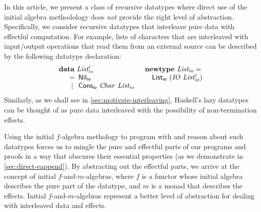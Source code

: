 \documentclass{jfp1}
\newcommand{\kw}[1]{\textbf{#1}}
\begin{document}
In this article, we present a class of recursive datatypes where
direct use of the initial algebra methodology does \emph{not} provide
the right level of abstraction. Specifically, we consider recursive
datatypes that interleave pure data with effectful computation. For
example, lists of characters that are interleaved with input/output
operations that read them from an external source can be described by
the following datatype declaration:
\begin{displaymath}\label{defn:listio}
  \begin{array}{ll}
    \kw{data}~\mathit{List'_{io}}
    &
    \kw{newtype}~\mathit{List_{io}} = 
    \\
    \quad
    \begin{array}[t]{c@{\hspace{0.5em}}l}
      = & \mathsf{Nil_{io}} \\
      | & \mathsf{Cons_{io}}~\mathit{Char}~\mathit{List_{io}} \\
    \end{array}
    &
    \quad \mathsf{List_{io}}~(\mathit{IO}~\mathit{List'_{io}})
  \end{array}
\end{displaymath}
Similarly, as we shall see in \autoref{sec:motivate-interleaving},
Haskell's lazy datatypes can be thought of as pure data interleaved
with the possibility of non-termination effects.

Using the initial $f$-algebra methology to program with and reason
about such datatypes forces us to mingle the pure and effectful parts
of our programs and proofs in a way that obscures their essential
properties (as we demonstrate in \autoref{sec:direct-eappend}). By
abstracting out the effectful parts, we arrive at the concept of
initial $f$-and-$m$-algebras, where $f$ is a functor whose initial
algebra describes the pure part of the datatype, and $m$ is a
monad that describes the effects. Initial $f$-and-$m$-algebras
represent a better level of abstraction for dealing with interleaved
data and effects.
\end{document}
